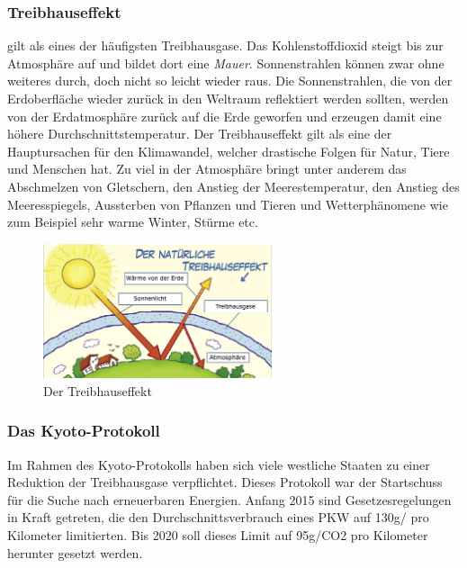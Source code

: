 \subsubsection{Treibhauseffekt}
 gilt als eines der häufigsten Treibhausgase.
Das Kohlenstoffdioxid steigt bis zur Atmosphäre auf und bildet dort eine \textit{Mauer}.
Sonnenstrahlen können zwar ohne weiteres durch, doch nicht so leicht wieder raus. Die Sonnenstrahlen,
die von der Erdoberfläche wieder zurück in den Weltraum reflektiert werden sollten, werden von der Erdatmosphäre zurück auf die Erde geworfen und erzeugen
damit eine höhere Durchschnittstemperatur.
Der Treibhauseffekt gilt als eine der Hauptursachen für den Klimawandel, welcher drastische Folgen für Natur, Tiere und Menschen hat. 
Zu viel  in der Atmosphäre bringt unter anderem das Abschmelzen von Gletschern, 
den Anstieg der Meerestemperatur, den Anstieg des Meeresspiegels, 
Aussterben von Pflanzen und Tieren und Wetterphänomene wie zum Beispiel sehr warme Winter, Stürme etc.

\begin{figure}[!htb]\centering
	\includegraphics[width=0.6\textwidth]{images/treibhaus1}
	\caption{Der Treibhauseffekt \cite{BOZH.ch1-co2-umwelt.treibhaus1}}
\end{figure}
 
\subsubsection{Das Kyoto-Protokoll}
Im Rahmen des Kyoto-Protokolls haben sich viele westliche Staaten zu einer Reduktion der Treibhausgase verpflichtet. 
Dieses Protokoll war der Startschuss für die Suche nach erneuerbaren Energien. 
Anfang 2015 sind Gesetzesregelungen in Kraft getreten, die den Durchschnittsverbrauch eines PKW auf 130g/ pro Kilometer limitierten. 
Bis 2020 soll dieses Limit auf 95g/CO2 pro Kilometer herunter gesetzt werden.

\clearpage
